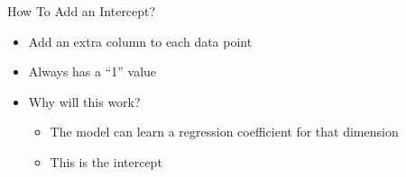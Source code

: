 \documentclass[aspectratio=169]{beamer}
\begin{document}
\begin{frame}{How To Add an Intercept?}

\begin{itemize}
\item Add an extra column to each data point
\item Always has a ``1'' value
\item Why will this work?
	\begin{itemize}
	\item The model can learn a regression coefficient for that dimension
	\item This is the intercept
	\end{itemize}
\end{itemize}
\end{frame}
\end{document}
